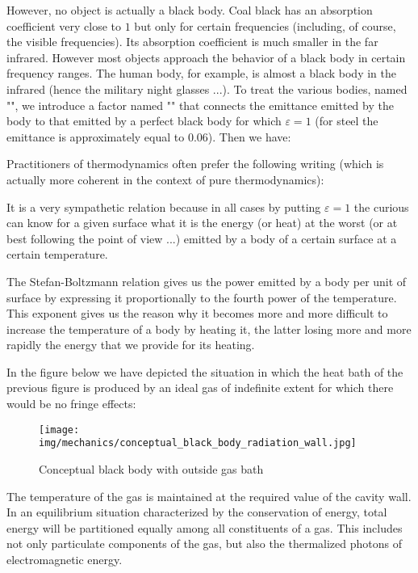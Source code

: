 	However, no object is actually a black body. Coal black has an absorption coefficient very close to $1$ but only for certain frequencies (including, of course, the visible frequencies). Its absorption coefficient is much smaller in the far infrared. However most objects approach the behavior of a black body in certain frequency ranges. The human body, for example, is almost a black body in the infrared (hence the military night glasses ...). To treat the various bodies, named "", we introduce a factor named "" that connects the emittance emitted by the body to that emitted by a perfect black body for which $\varepsilon=1$ (for steel the emittance is approximately equal to $0.06$). Then we have:
	
	Practitioners of thermodynamics often prefer the following writing (which is actually more coherent in the context of pure thermodynamics):
	
	It is a very sympathetic relation because in all cases by putting $\varepsilon=1$ the curious can know for a given surface what it is the energy (or heat) at the worst (or at best following the point of view ...) emitted by a body of a certain surface at a certain temperature.
	\begin{tcolorbox}[title=Remark,colframe=black,arc=10pt]
	The Stefan-Boltzmann relation gives us the power emitted by a body per unit of surface by expressing it proportionally to the fourth power of the temperature. This exponent gives us the reason why it becomes more and more difficult to increase the temperature of a body by heating it, the latter losing more and more rapidly the energy that we provide for its heating.
	\end{tcolorbox}
	
	In the figure below we have depicted the situation in which the heat bath of the previous figure is produced by an ideal gas of indefinite extent for which there would be no fringe effects:
	\begin{figure}[H]
		\centering
		\texttt{[image: img/mechanics/conceptual\_black\_body\_radiation\_wall.jpg]}
		\caption[]{Conceptual black body with outside gas bath}
	\end{figure}
	The temperature of the gas is maintained at the required value of the cavity wall. In an equilibrium situation characterized by the conservation of energy, total energy will be partitioned equally among all constituents of a gas. This includes not only particulate components of the gas, but also the thermalized photons of electromagnetic energy.

